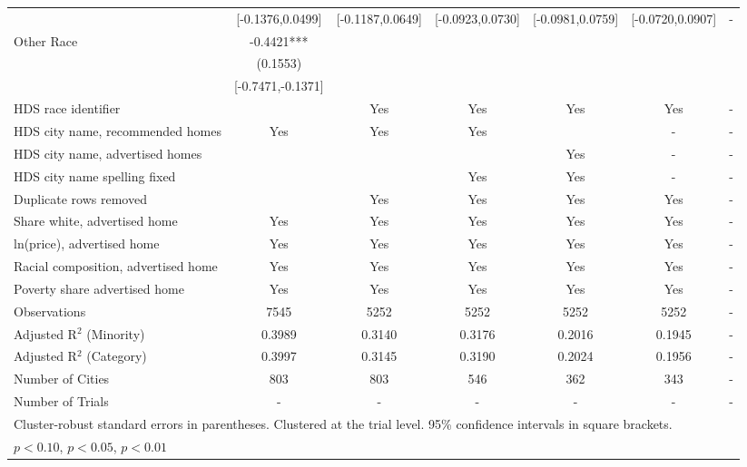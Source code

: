 \begin{table}[htbp]
{\begin{tabular}{l*{6}{c}}
 & [-0.1376,0.0499] & [-0.1187,0.0649] & [-0.0923,0.0730] & [-0.0981,0.0759] & [-0.0720,0.0907] & - \\
Other Race & -0.4421*** &  &  &  &  &  \\
 & (0.1553) &  &  &  &  &  \\
 & [-0.7471,-0.1371] &  &  &  &  &  \\
\midrule
HDS race identifier & & Yes & Yes & Yes & Yes & - \\
HDS city name, recommended homes & Yes & Yes & Yes & & - & -\\
HDS city name, advertised homes &  &  &  & Yes & - & -\\
HDS city name spelling fixed & & & Yes & Yes & - & -\\
Duplicate rows removed &  & Yes & Yes & Yes & Yes & - \\
\midrule
Share white, advertised home  & Yes & Yes & Yes & Yes & Yes & - \\
ln(price), advertised home  & Yes & Yes & Yes & Yes & Yes & - \\
Racial composition, advertised home & Yes & Yes & Yes & Yes & Yes & - \\
Poverty share advertised home & Yes & Yes & Yes & Yes & Yes & - \\
Observations & 7545 & 5252 & 5252 & 5252 & 5252 & - \\
Adjusted R$^2$ (Minority) & 0.3989 & 0.3140 & 0.3176 & 0.2016 & 0.1945 & - \\
Adjusted R$^2$ (Category) & 0.3997 & 0.3145 & 0.3190 & 0.2024 & 0.1956 & - \\
Number of Cities & 803 & 803 & 546 & 362 & 343 & - \\
Number of Trials & - & - & - & - & - & - \\
\bottomrule
\multicolumn{7}{l}{\footnotesize Cluster-robust standard errors in parentheses. Clustered at the trial level. 95\% confidence intervals in square brackets.}\\
\multicolumn{7}{l}{\footnotesize \sym{*} \(p<0.10\), \sym{**} \(p<0.05\), \sym{***} \(p<0.01\)}\\
\end{tabular}
}
\end{table}
